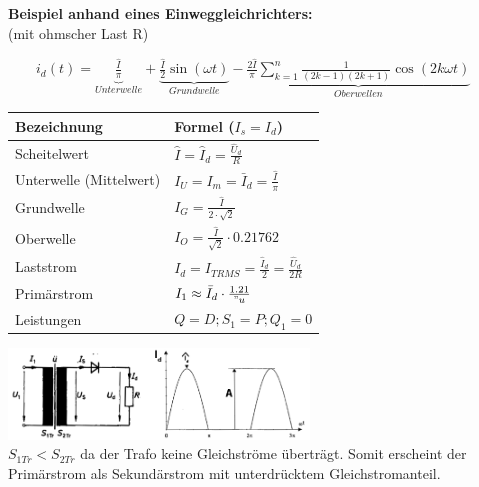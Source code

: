	\begin{minipage}[c]{8cm} 
	   \textbf{Beispiel anhand eines Einweggleichrichters:}	  	\\
	   (mit ohmscher Last R) 
	\end{minipage}   
	\begin{minipage}[c]{10cm} 	
	   $ \qquad i_d(t) = \underbrace{\frac{\hat{I}}{\pi}}_{Unterwelle} + \underbrace{\frac{\hat{I}}{2}
	   \sin(\omega t)}_{Grundwelle} - \underbrace{\frac{2\hat{I}}{\pi} \sum\limits_{k=1}^n \frac{1}{(2k-1)(2k+1)} \cos(2k\omega t)}_{Oberwellen} $
	\end{minipage}   
		
	\begin{minipage}[c]{10cm}  
		\begin{tabular}{| l | l |}
    		\hline 
      		\textbf{Bezeichnung}
      		& \textbf{Formel} ($I_s = I_d$)\\
      		\hline
      		Scheitelwert 
      		& $\hat{I} = \hat{I}_d = \frac{\hat{U}_d}{R} $ \\
      		Unterwelle (Mittelwert)
      		& $I_U = I_m = \bar{I}_d  = \frac{\hat{I}}{\pi}$ \\
      		Grundwelle
      		& $I_G = \frac{\hat{I}}{2 \cdot \sqrt{2}}$ \\
      		Oberwelle
      		& $I_O = \frac{\hat{I}}{\sqrt{2}} \cdot 0.21762$ \\
      		Laststrom
      		& $I_{d} = I_{TRMS} =\frac{\hat{I}_d}{2} = \frac{\hat{U}_d}{2R}$ \\
      		Prim\"arstrom
      		& $I_1 \approx \bar{I}_d \cdot \frac{1.21}{"u}$ \\
      		Leistungen
      		& $Q = D ; S_1 = P ; Q_1 = 0$ \\
      		\hline 
    	\end{tabular}
	\end{minipage}   
	\begin{minipage}[c]{8cm}  
			\includegraphics[width=8cm]{bilder/EinwegGR.png}  \\			
	$S_{1Tr} < S_{2Tr}$ da der Trafo keine Gleichstr\"ome übertr\"agt. Somit erscheint der Prim\"arstrom
	als Sekund\"arstrom mit unterdrücktem Gleichstromanteil.\\			
	\end{minipage}


